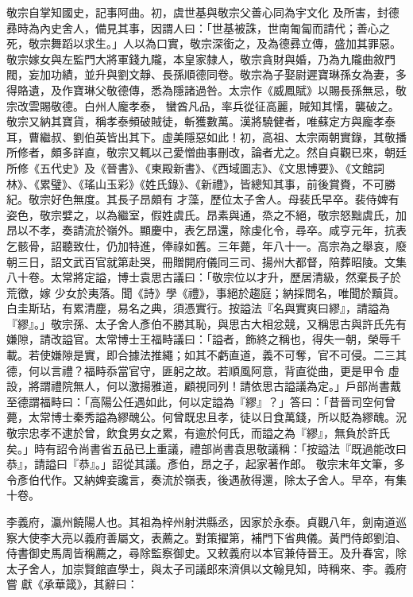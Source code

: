 \begin{pinyinscope}
 敬宗自掌知國史，記事阿曲。初，虞世基與敬宗父善心同為宇文化
 及所害，封德彞時為內史舍人，備見其事，因謂人曰：「世基被誅，世南匍匐而請代；善心之死，敬宗舞蹈以求生。」人以為口實，敬宗深銜之，及為德彞立傳，盛加其罪惡。敬宗嫁女與左監門大將軍錢九隴，本皇家隸人，敬宗貪財與婚，乃為九隴曲敘門閥，妄加功績，並升與劉文靜、長孫順德同卷。敬宗為子娶尉遲寶琳孫女為妻，多得賂遺，及作寶琳父敬德傳，悉為隱諸過咎。太宗作《威鳳賦》以賜長孫無忌，敬宗改雲賜敬德。白州人龐孝泰，
 蠻酋凡品，率兵從征高麗，賊知其懦，襲破之。敬宗又納其寶貨，稱孝泰頻破賊徒，斬獲數萬。漢將驍健者，唯蘇定方與龐孝泰耳，曹繼叔、劉伯英皆出其下。虛美隱惡如此！初，高祖、太宗兩朝實錄，其敬播所修者，頗多詳直，敬宗又輒以己愛憎曲事刪改，論者尤之。然自貞觀已來，朝廷所修《五代史》及《晉書》、《東殿新書》、《西域圖志》、《文思博要》、《文館詞林》、《累璧》、《瑤山玉彩》《姓氏錄》、《新禮》，皆總知其事，前後賞賚，不可勝紀。敬宗好色無度。其長子昂頗有
 才藻，歷位太子舍人。母裴氏早卒。裴侍婢有姿色，敬宗嬖之，以為繼室，假姓虞氏。昂素與通，烝之不絕，敬宗怒黜虞氏，加昂以不孝，奏請流於嶺外。顯慶中，表乞昂還，除虔化令，尋卒。咸亨元年，抗表乞骸骨，詔聽致仕，仍加特進，俸祿如舊。三年薨，年八十一。高宗為之舉哀，廢朝三日，詔文武百官就第赴哭，冊贈開府儀同三司、揚州大都督，陪葬昭陵。文集八十卷。太常將定謚，博士袁思古議曰：「敬宗位以才升，歷居清級，然棄長子於荒徼，嫁
 少女於夷落。聞《詩》學《禮》，事絕於趨庭；納採問名，唯聞於黷貨。白圭斯玷，有累清塵，易名之典，須憑實行。按謚法『名與實爽曰繆』，請謚為『繆』。」敬宗孫、太子舍人彥伯不勝其恥，與思古大相忿競，又稱思古與許氏先有嫌隙，請改謚官。太常博士王福畤議曰：「謚者，飾終之稱也，得失一朝，榮辱千載。若使嫌隙是實，即合據法推繩；如其不虧直道，義不可奪，官不可侵。二三其德，何以言禮？福畤忝當官守，匪躬之故。若順風阿意，背直從曲，更是甲令
 虛設，將謂禮院無人，何以激揚雅道，顧視同列！請依思古謚議為定。」戶部尚書戴至德謂福畤曰：「高陽公任遇如此，何以定謚為『繆』？」答曰：「昔晉司空何曾薨，太常博士秦秀謚為繆醜公。何曾既忠且孝，徒以日食萬錢，所以貶為繆醜。況敬宗忠孝不逮於曾，飲食男女之累，有逾於何氏，而謚之為『繆』，無負於許氏矣。」時有詔令尚書省五品已上重議，禮部尚書袁思敬議稱：「按謚法『既過能改曰恭』，請謚曰『恭』。」詔從其議。彥伯，昂之子，起家著作郎。
 敬宗末年文筆，多令彥伯代作。又納婢妾讒言，奏流於嶺表，後遇赦得還，除太子舍人。早卒，有集十卷。



 李義府，瀛州饒陽人也。其祖為梓州射洪縣丞，因家於永泰。貞觀八年，劍南道巡察大使李大亮以義府善屬文，表薦之。對策擢第，補門下省典儀。黃門侍郎劉洎、侍書御史馬周皆稱薦之，尋除監察御史。又敕義府以本官兼侍晉王。及升春宮，除太子舍人，加崇賢館直學士，與太子司議郎來濟俱以文翰見知，時稱來、李。義府嘗
 獻《承華箴》，其辭曰：




\end{pinyinscope}
